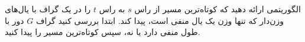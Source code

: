 الگوریتمی ارائه دهید که کوتاه‌ترین مسیر از راس $s$ به راس $t$ را در یک گراف با یال‌های وزن‌دار که تنها وزن یک یال منفی است، پیدا کند. ابتدا بررسی کنید گراف $G$ دور با طول منفی دارد یا نه، سپس کوتاه‌ترین مسیر را پیدا کنید. 